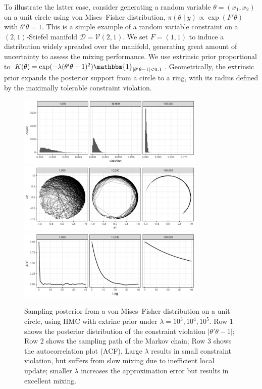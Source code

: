 \documentclass[10pt]{article}
\newcommand{\mc}[1]{\mathcal{#1}}
\begin{document}
To illustrate the latter case, consider generating a random variable $\theta=(x_1,x_2)$ on a unit circle using von Mises--Fisher distribution, $\pi(\theta \mid y) \propto \exp(F'\theta)$ with $\theta'\theta =1$. This is a simple example of a random variable constraint on a $(2,1)$-Stiefel manifold $\mc D =\mc V(2,1)$. We set $F=(1,1)$ to induce a distribution widely spreaded over the manifold, generating great amount of uncertainty to assess the mixing performance. We use extrinsic prior proportional to $K(\theta)= \exp(-\lambda (\theta'\theta -1)^2) \mathbbm{1}_{|\theta'\theta -1|<0.1}$. Geometrically, the extrinsic prior expands the posterior support from a circle to a ring, with its radius defined by the maximally tolerable constraint violation. 

\begin{figure}[H]
 \centering
  \includegraphics[width=0.8\textwidth]{unit_circle_violation}
 \includegraphics[width=0.8\textwidth]{unit_circle_path}
 \includegraphics[width=0.8\textwidth]{unit_circle_acf}
\caption{Sampling posterior from a von Mises--Fisher distribution on a unit circle, using HMC with extrinc prior under $\lambda=10^3,10^4,10^5$. Row $1$ shows the posterior distribution of the constraint violation $|\theta'\theta -1|$; Row $2$ shows the sampling path of the Markov chain; Row $3$ shows the autocorrelation plot (ACF). Large $\lambda$ results in small constraint violation, but suffers from slow mixing due to inefficient local update; smaller $\lambda$ increases the approximation error but results in excellent mixing.}
\label{unit_circle}
\end{figure}
\end{document}
